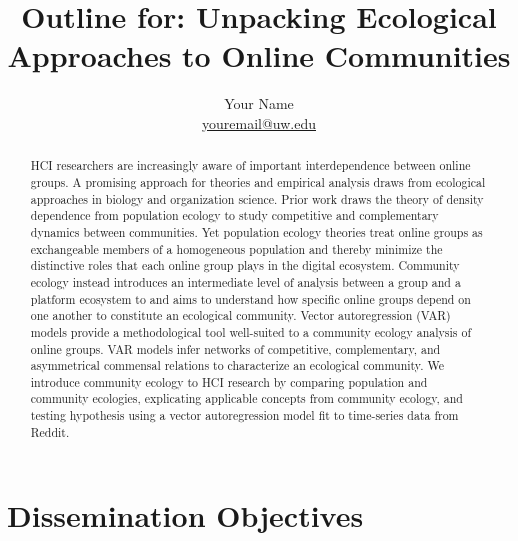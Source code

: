 \documentclass[12pt]{memoir}
\begin{document}
\renewcommand{\arraystretch}{2}
\setlength{\parskip}{4.5pt}

\baselineskip 16pt

\title{Outline for: Unpacking Ecological Approaches to Online Communities }
\author{Your Name\\
        \href{mailto:youremail@uw.edu}{youremail@uw.edu}}
\date{}

\published{\textsc{\textcolor{BrickRed}{This document is an
  unpublished draft.\\ Please do not distribute or cite without
  permission.}}}

\maketitle

\begin{abstract}
  HCI researchers are increasingly aware of important interdependence between online groups. A promising approach for theories and empirical analysis draws from ecological approaches in biology and organization science. Prior work draws the theory of density dependence from population ecology to study competitive and complementary dynamics between communities.  Yet population ecology theories treat online groups as exchangeable members of a homogeneous population and thereby minimize the distinctive roles that each online group plays in the digital ecosystem.  Community ecology instead introduces an intermediate level of analysis between a group and a platform ecosystem to and aims to understand how specific online groups depend on one another to constitute an ecological community.   Vector autoregression (VAR) models provide a methodological tool well-suited to a community ecology analysis of online groups. VAR models infer networks of competitive, complementary, and asymmetrical commensal relations to characterize an ecological community.  We introduce community ecology to HCI research by comparing population and community ecologies, explicating applicable concepts from community ecology, and testing hypothesis using a vector autoregression model fit to time-series data from Reddit.
\end{abstract}

\section{Dissemination Objectives}
\end{document}
